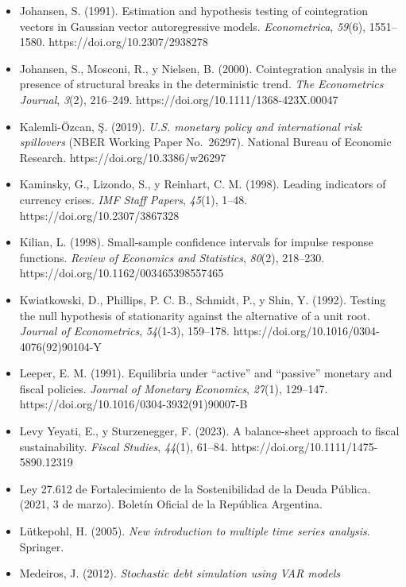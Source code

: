 \begin{itemize}[label={},leftmargin=1.27cm,itemindent=-1.27cm,itemsep=0.6\baselineskip]
  observations and regression residuals. \emph{International Statistical
  Review}, \emph{55}(2), 163--172. https://doi.org/10.2307/1403192
\item
  Johansen, S. (1991). Estimation and hypothesis testing of
  cointegration vectors in Gaussian vector autoregressive models.
  \emph{Econometrica}, \emph{59}(6), 1551--1580.
  https://doi.org/10.2307/2938278
\item
  Johansen, S., Mosconi, R., y Nielsen, B. (2000). Cointegration
  analysis in the presence of structural breaks in the deterministic
  trend. \emph{The Econometrics Journal}, \emph{3}(2), 216--249.
  https://doi.org/10.1111/1368-423X.00047
\item
  Kalemli-Özcan, Ş. (2019). \emph{U.S. monetary policy and international
  risk spillovers} (NBER Working Paper No.~26297). National Bureau of
  Economic Research. https://doi.org/10.3386/w26297
\item
  Kaminsky, G., Lizondo, S., y Reinhart, C. M. (1998). Leading
  indicators of currency crises. \emph{IMF Staff Papers}, \emph{45}(1),
  1--48. https://doi.org/10.2307/3867328
\item
  Kilian, L. (1998). Small-sample confidence intervals for impulse
  response functions. \emph{Review of Economics and Statistics},
  \emph{80}(2), 218--230. https://doi.org/10.1162/003465398557465
\item
  Kwiatkowski, D., Phillips, P. C. B., Schmidt, P., y Shin, Y. (1992).
  Testing the null hypothesis of stationarity against the alternative of
  a unit root. \emph{Journal of Econometrics}, \emph{54}(1-3), 159--178.
  https://doi.org/10.1016/0304-4076(92)90104-Y
\item
  Leeper, E. M. (1991). Equilibria under ``active'' and ``passive''
  monetary and fiscal policies. \emph{Journal of Monetary Economics},
  \emph{27}(1), 129--147. https://doi.org/10.1016/0304-3932(91)90007-B
\item
  Levy Yeyati, E., y Sturzenegger, F. (2023). A balance-sheet approach
  to fiscal sustainability. \emph{Fiscal Studies}, \emph{44}(1), 61--84.
  https://doi.org/10.1111/1475-5890.12319
\item
  Ley 27.612 de Fortalecimiento de la Sostenibilidad de la Deuda
  Pública. (2021, 3 de marzo). Boletín Oficial de la República
  Argentina.
\item
  Lütkepohl, H. (2005). \emph{New introduction to multiple time series
  analysis}. Springer.
\item
  Medeiros, J. (2012). \emph{Stochastic debt simulation using VAR models
}
\end{itemize}

